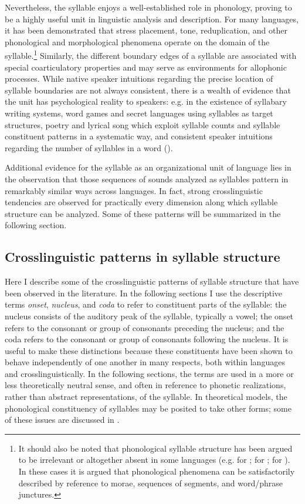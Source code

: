   Nevertheless, the syllable enjoys a well-established role in phonology, proving to be a highly useful unit in linguistic analysis and description. For many languages, it has been demonstrated that stress placement, tone, reduplication, and other phonological and morphological phenomena operate on the domain of the syllable.\footnote{{It should also be noted that phonological syllable structure has been argued to be irrelevant or altogether absent in some languages (e.g. \citealt{Newman1947} for ; \citealt{Hyman2011,Hyman2015} for ; \citealt{Labrune2012} for ). In these cases it is argued that phonological phenomena can be satisfactorily described by reference to morae, sequences of segments, and word/phrase junctures.}} Similarly, the different boundary edges of a syllable are associated with special coarticulatory properties and may serve as environments for allophonic processes. While native speaker intuitions regarding the precise location of syllable boundaries are not always consistent, there is a wealth of evidence that the unit has psychological reality to speakers: e.g. in the existence of syllabary writing systems, word games and secret languages using syllables as target structures, poetry and lyrical song which exploit syllable counts and syllable constituent patterns in a systematic way, and consistent speaker intuitions regarding the number of syllables in a word (\citealt{BellHooper1978,Blevins1995,ValléeEtAl2009}).

  Additional evidence for the syllable as an organizational unit of language lies in the observation that those sequences of sounds analyzed as syllables pattern in remarkably similar ways across languages. In fact, strong crosslinguistic tendencies are observed for practically every dimension along which syllable structure can be analyzed. Some of these patterns will be summarized in the following section.

\subsection{Crosslinguistic patterns in syllable structure}\label{sec:1.1.2}

  Here I describe some of the crosslinguistic patterns of syllable structure that have been observed in the literature. In the following sections I use the descriptive terms \textit{onset}, \textit{nucleus}, and \textit{coda} to refer to constituent parts of the syllable: the nucleus consists of the auditory peak of the syllable, typically a vowel; the onset refers to the consonant or group of consonants preceding the nucleus; and the coda refers to the consonant or group of consonants following the nucleus. It is useful to make these distinctions because these constituents have been shown to behave independently of one another in many respects, both within languages and crosslinguistically. In the following sections, the terms are used in a more or less theoretically neutral sense, and often in reference to phonetic realizations, rather than abstract representations, of the syllable. In theoretical models, the phonological constituency of syllables may be posited to take other forms; some of these issues are discussed in .

